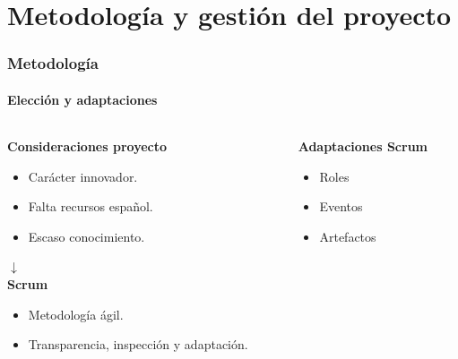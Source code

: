 \documentclass{beamer}
\begin{document}
\section{Metodología y gestión del proyecto}
 \begin{frame}
 	
 	\frametitle{Metodología}
 	\framesubtitle{Elección y adaptaciones}

 		\begin{columns}[T]
 		\hspace{-3cm}

 		\begin{column}{0.8\textwidth}
 			\begin{description}[labelwidth=0.01mm]
				\item \textbf{Consideraciones proyecto}
			 	\begin{itemize}
				\item Carácter innovador.
				\item Falta recursos español.
				\item Escaso conocimiento.
			 	\end{itemize}
			 	\pause
 				\hspace{3cm}$\downarrow$ \\
		 		\textbf{Scrum}
	 	 		\begin{itemize}
			 	 	\item Metodología ágil.
			 		\item Transparencia, inspección y adaptación.
		 		\end{itemize}
			\end{description}
		 \end{column}
	 	\pause
	 	\hspace{-3.5cm}
		 \begin{column}{0.8\textwidth}
		 	\begin{description}[labelwidth=0.01mm]
		 		\item \textbf{Adaptaciones Scrum} 			 	\pause
		 		\begin{itemize}
		 			\item Roles
		 			\item Eventos
		 			\item Artefactos
		 		\end{itemize}
		 	\end{description}
	 	\end{column}
	\end{columns}
\end{frame}
\end{document}
